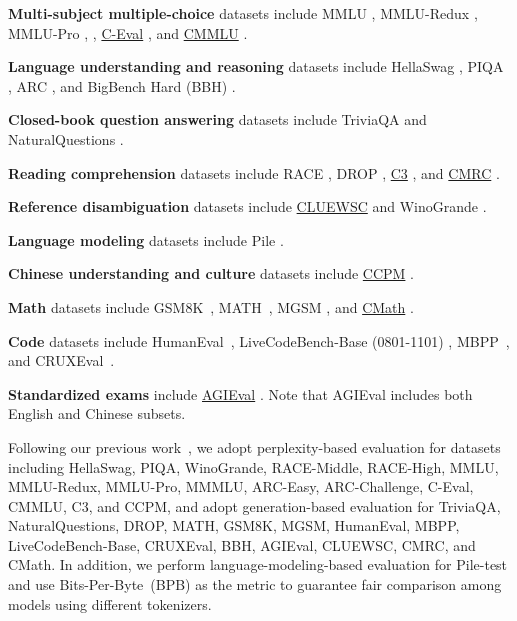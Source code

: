 \documentclass[11pt, a4paper, logo, copyright, nonumbering]{deepseek}
\begin{document}
\begin{CJK*}{UTF8}{gbsn}
\textbf{Multi-subject multiple-choice} datasets include MMLU \citep{mmlu}, MMLU-Redux \citep{mmlu_redux}, MMLU-Pro \citep{mmlu_pro},  \citep{mmmlu}, \underline{C-Eval} \citep{ceval}, and \underline{CMMLU} \citep{cmmlu}.

\textbf{Language understanding and reasoning} datasets include HellaSwag \citep{hellaswag}, PIQA \citep{piqa}, ARC \citep{arc}, and BigBench Hard (BBH) \citep{bbh}.

\textbf{Closed-book question answering} datasets include TriviaQA \citep{joshi-etal-2017-triviaqa} and NaturalQuestions \citep{naturalquestions}.

\textbf{Reading comprehension} datasets include RACE \cite{race}, DROP \citep{drop}, \underline{C3} \citep{sun2019investigating}, and \underline{CMRC} \citep{cui-etal-2019-span}.

\textbf{Reference disambiguation} datasets include \underline{CLUEWSC} \citep{clue} and WinoGrande \cite{sakaguchi2019winogrande}.

\textbf{Language modeling} datasets include Pile \citep{pile}.

\textbf{Chinese understanding and culture} datasets include \underline{CCPM} \citep{li2021ccpm}.

\textbf{Math} datasets include GSM8K~\citep{gsm8k}, MATH~\citep{hendrycks2021measuring}, MGSM \citep{mgsm}, and \underline{CMath} \citep{wei2023cmath}.

\textbf{Code} datasets include HumanEval~\citep{codex}, LiveCodeBench-Base (0801-1101) \citep{livecodebench}, MBPP~\citep{mbpp}, and CRUXEval~\citep{gu2024cruxeval}.

\textbf{Standardized exams} include \underline{AGIEval} \citep{agieval}. 
Note that AGIEval includes both English and Chinese subsets.

Following our previous work~\citep{dsvi,dsvii}, we adopt perplexity-based evaluation for datasets including HellaSwag, PIQA, WinoGrande, RACE-Middle, RACE-High, MMLU, MMLU-Redux, MMLU-Pro, MMMLU, ARC-Easy, ARC-Challenge, C-Eval, CMMLU, C3, and CCPM, and adopt generation-based evaluation for TriviaQA, NaturalQuestions, DROP, MATH, GSM8K, MGSM, HumanEval, MBPP, LiveCodeBench-Base, CRUXEval, BBH, AGIEval, CLUEWSC, CMRC, and CMath. 
In addition, we perform language-modeling-based evaluation for Pile-test and use Bits-Per-Byte~(BPB) as the metric to guarantee fair comparison among models using different tokenizers. 




\end{CJK*}
\end{document}
